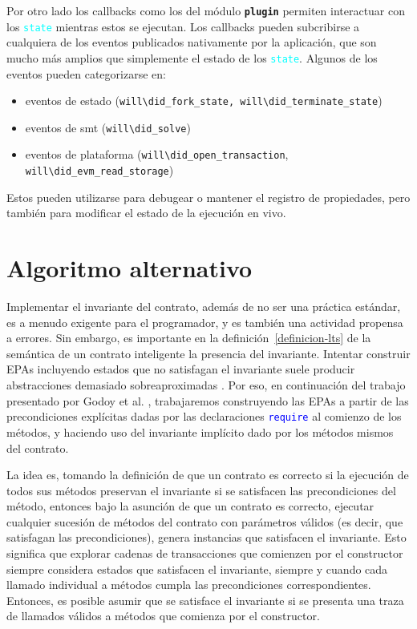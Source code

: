 Por otro lado los callbacks como los del módulo
\texttt{\textbf{plugin}} permiten interactuar con los \textcolor{cyan}{\texttt{state}} mientras estos se ejecutan.
Los callbacks pueden subcribirse a cualquiera de los eventos publicados nativamente por la aplicación, que son mucho más amplios que simplemente el estado de los \textcolor{cyan}{\texttt{state}}.
Algunos de los eventos pueden categorizarse en:
\begin{itemize}
    \item eventos de estado (\texttt{will\textbackslash did\_fork\_state, will\textbackslash did\_terminate\_state})
    \item eventos de smt (\texttt{will\textbackslash did\_solve})
    \item eventos de plataforma (\texttt{will\textbackslash did\_open\_transaction},\\ \texttt{will\textbackslash did\_evm\_read\_storage})
\end{itemize}
Estos pueden utilizarse para debugear o mantener el registro de propiedades, pero también para modificar el estado de la ejecución en vivo.



\section{Algoritmo alternativo}
Implementar el invariante del contrato, además de no ser una práctica estándar, es a menudo exigente para el programador, y es también una actividad propensa a errores.
Sin embargo, es importante en la definición~\ref{definicion-lts} de la semántica de un contrato inteligente la  presencia del invariante.
Intentar construir EPAs incluyendo estados que no satisfagan el invariante suele producir abstracciones demasiado sobreaproximadas \cite{de-caso-epa}.
Por eso, en continuación del trabajo presentado por Godoy et al. \cite{predicate-abstraction-for-smart-contract-validation}, trabajaremos construyendo las EPAs a partir de las precondiciones explícitas dadas por las declaraciones \textcolor{blue}{\texttt{require}} al comienzo de los métodos, y haciendo uso  del invariante implícito dado por los métodos mismos del contrato.

La idea es, tomando la definición de que un contrato es correcto si la ejecución de todos sus métodos preservan el invariante si se satisfacen las precondiciones del método, entonces bajo la asunción de que un contrato es correcto, ejecutar cualquier sucesión de métodos del contrato con parámetros válidos (es decir, que satisfagan las precondiciones), genera instancias que satisfacen el invariante.
Esto significa que explorar cadenas de transacciones que comienzen por el constructor siempre considera estados que satisfacen el invariante, siempre y cuando cada llamado individual a métodos cumpla las precondiciones correspondientes.
Entonces, es posible asumir que se satisface el invariante si se presenta una traza de llamados válidos a métodos que comienza por el constructor.

